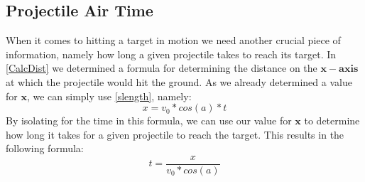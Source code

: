 \subsection{Projectile Air Time}
When it comes to hitting a target in motion we need another crucial piece of information,
namely how long a given projectile takes to reach its target.
In \autoref{CalcDist} we determined a formula for determining the distance on
the $\mathbf{x-axis}$ at which the projectile would hit the ground. As we
already determined a value for $\mathbf{x}$, we can simply use
\autoref{slength}, namely:
\begin{equation}
x=v_0*cos(a)*t
\end{equation}
By isolating for the time in this formula, we can use our value for $\mathbf{x}$
to determine how long it takes for a given projectile to reach the target. This
results in the following formula:
\begin{equation}\label{TimeEq}
t=\frac{x}{v_0*cos(a)}
\end{equation}

% 
% 
% 


